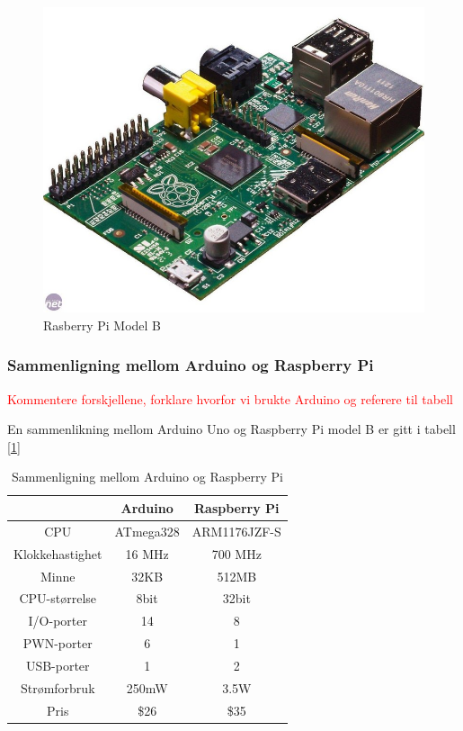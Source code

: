 \begin{figure}[h!]
\centering
\includegraphics[scale = 0.25]{img/pi.jpg}
\caption{Rasberry Pi Model B}
\end{figure}  

\subsubsection{Sammenligning mellom Arduino og Raspberry Pi}

\textcolor{red}{Kommentere forskjellene, forklare hvorfor vi brukte Arduino og referere til tabell}

En sammenlikning mellom Arduino Uno og Raspberry Pi model B er gitt i tabell [\ref{tab:ArdRas}]

\begin{table}[h!]
\caption{Sammenligning mellom Arduino og Raspberry Pi}
\centering
\begin{tabular}{ |c |c |c| }
	\hline
   & Arduino & Raspberry Pi \\
	\hline
  	CPU & 	ATmega328 & ARM1176JZF-S \\
  	Klokkehastighet & 16 MHz & 700 MHz \\
	Minne & 32KB & 512MB\\ 
	CPU-størrelse & 8bit & 32bit\\
	I/O-porter & 14 & 8 \\
	PWN-porter & 6 & 1 \\
	USB-porter & 1 & 2 \\
	Strømforbruk & 250mW & 3.5W\\
	Pris & \$26 & \$35 \\
	\hline  
\end{tabular}
	\label{tab:ArdRas}
\end{table}

